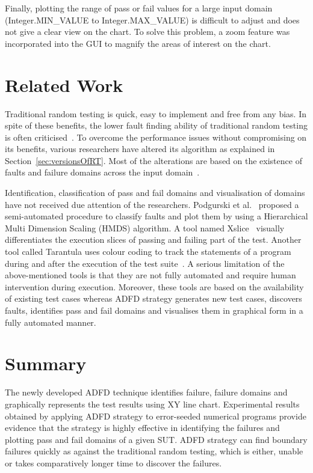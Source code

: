 Finally, plotting the range of pass or fail values for a large input domain (Integer.MIN\_VALUE to Integer.MAX\_VALUE) is difficult to adjust and does not give a clear view on the chart. To solve this problem, a zoom feature was incorporated into the GUI to magnify the areas of interest on the chart.



\section{Related Work} \label{sec:relatedWork}
Traditional random testing is quick, easy to implement and free from any bias. In spite of these benefits, the lower fault finding ability of traditional random testing is often criticised~\cite{myers2011art, offutt1996semantic}. To overcome the performance issues without compromising on its benefits, various researchers have altered its algorithm as explained in Section~\ref{sec:versionsOfRT}. Most of the alterations are based on the existence of faults and failure domains across the input domain~\cite{chan1996proportional}. 

Identification, classification of pass and fail domains and visualisation of domains have not received due attention of the researchers. Podgurski et al.~\cite{podgurski2003automated} proposed a semi-automated procedure to classify faults and plot them by using a Hierarchical Multi Dimension Scaling (HMDS) algorithm. A tool named Xslice~\cite{agrawal1995fault} visually differentiates the execution slices of passing and failing part of the test. Another tool called Tarantula uses colour coding to track the statements of a program during and after the execution of the test suite~\cite{jones2002visualization}. A serious limitation of the above-mentioned tools is that they are not fully automated and require human intervention during execution. Moreover, these tools are based on the availability of existing test cases whereas ADFD strategy generates new test cases, discovers faults, identifies pass and fail domains and visualises them in graphical form in a fully automated manner. 


\section{Summary} \label{sec:conclusion}
The newly developed ADFD technique identifies failure, failure domains and graphically represents the test results using XY line chart. Experimental results obtained by applying ADFD strategy to error-seeded numerical programs provide evidence that the strategy is highly effective in identifying the failures and plotting pass and fail domains of a given SUT. ADFD strategy can find boundary failures quickly as against the traditional random testing, which is either, unable or takes comparatively longer time to discover the failures.

